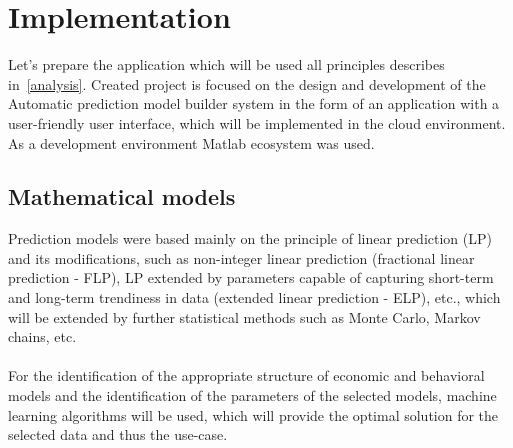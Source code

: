 \chapter{Implementation}
    Let's prepare the application which will be used all principles describes in~\ref{analysis}. Created project is focused on the design and development of the Automatic prediction model builder system in the form of an application with a user-friendly user interface, which will be implemented in the cloud environment. As a development environment Matlab ecosystem was used.
    \section{Mathematical models}
    Prediction models were based mainly on the principle of linear prediction (LP) and its modifications, such as non-integer linear prediction (fractional linear prediction - FLP), LP extended by parameters capable of capturing short-term and long-term trendiness in data (extended linear prediction - ELP), etc., which will be extended by further statistical methods such as Monte Carlo, Markov chains, etc.\\
    \\
    For the identification of the appropriate structure of economic and behavioral models and the identification of the parameters of the selected models, machine learning algorithms will be used, which will provide the optimal solution for the selected data and thus the use-case.
